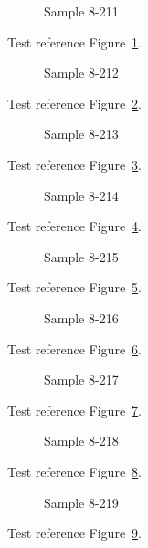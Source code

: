 \begin{figure}[tbhp]
\caption{Sample 8-211}
\label{fig:sample-8-211}
\end{figure}

Test reference Figure~\ref{fig:sample-8-211}.

\begin{figure}[tbhp]
\caption{Sample 8-212}
\label{fig:sample-8-212}
\end{figure}

Test reference Figure~\ref{fig:sample-8-212}.

\begin{figure}[tbhp]
\caption{Sample 8-213}
\label{fig:sample-8-213}
\end{figure}

Test reference Figure~\ref{fig:sample-8-213}.

\begin{figure}[tbhp]
\caption{Sample 8-214}
\label{fig:sample-8-214}
\end{figure}

Test reference Figure~\ref{fig:sample-8-214}.

\begin{figure}[tbhp]
\caption{Sample 8-215}
\label{fig:sample-8-215}
\end{figure}

Test reference Figure~\ref{fig:sample-8-215}.

\begin{figure}[tbhp]
\caption{Sample 8-216}
\label{fig:sample-8-216}
\end{figure}

Test reference Figure~\ref{fig:sample-8-216}.

\begin{figure}[tbhp]
\caption{Sample 8-217}
\label{fig:sample-8-217}
\end{figure}

Test reference Figure~\ref{fig:sample-8-217}.

\begin{figure}[tbhp]
\caption{Sample 8-218}
\label{fig:sample-8-218}
\end{figure}

Test reference Figure~\ref{fig:sample-8-218}.

\begin{figure}[tbhp]
\caption{Sample 8-219}
\label{fig:sample-8-219}
\end{figure}

Test reference Figure~\ref{fig:sample-8-219}.

